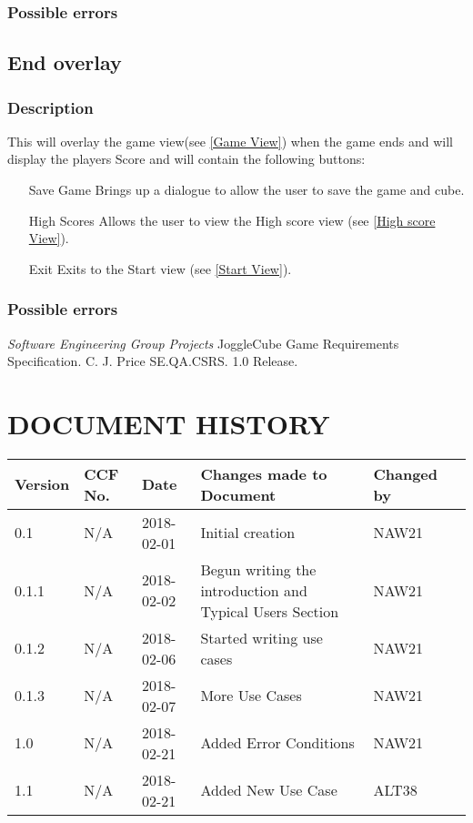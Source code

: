 \documentclass{project}
\begin{document}
\subsubsection{Possible errors}


\subsection{End overlay} \label{End Overlay}
\subsubsection{Description}
This will overlay the game view(see \ref{Game View}) when the game ends and will display the players Score and will contain the following buttons:
\begin{itemize}
\item[Save Game] Brings up a dialogue to allow the user to save the game and cube.
\item[High Scores] Allows the user to view the High score view (see \ref{High score View}).
\item[Exit] Exits to the Start view (see \ref{Start View}).
\end{itemize}
\subsubsection{Possible errors}


\clearpage
{}
\begin{thebibliography}{5}
 \emph{Software Engineering Group Projects}
JoggleCube Game Requirements Specification.
C. J. Price SE.QA.CSRS. 1.0 Release.
\end{thebibliography}
\clearpage
{}
\section*{DOCUMENT HISTORY}
\begin{tabular}{| l | l | l | l | l | l |}
\hline
Version & CCF No. & Date & Changes made to Document & Changed by \\
\hline
0.1 & N/A & 2018-02-01 & Initial creation & NAW21 \\
\hline
0.1.1 & N/A & 2018-02-02 & Begun writing the introduction and Typical Users Section & NAW21 \\
\hline
0.1.2 & N/A & 2018-02-06 & Started writing use cases & NAW21 \\
\hline
0.1.3 & N/A & 2018-02-07 & More Use Cases & NAW21 \\
\hline
1.0 & N/A & 2018-02-21 & Added Error Conditions & NAW21 \\
\hline
1.1 & N/A & 2018-02-21 & Added New Use Case & ALT38 \\
\hline
\end{tabular}
\label{thelastpage}
\end{document}
